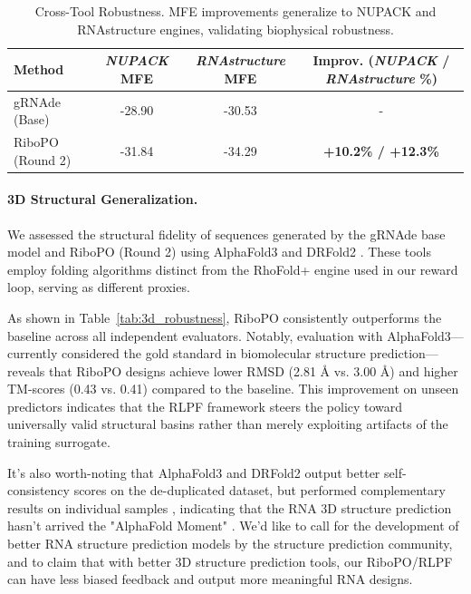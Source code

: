 {{\begin{table}[htbp]
\centering
\caption{Cross-Tool Robustness. MFE improvements generalize to NUPACK and RNAstructure engines, validating biophysical robustness.}
\label{tab:crosstool}
\begin{tabular}{lccc}
\toprule
\textbf{Method} & \textbf{\textit{NUPACK} MFE} & \textbf{\textit{RNAstructure} MFE} & \textbf{Improv. (\small{\textit{NUPACK} / \textit{RNAstructure}} \%)} \\
\midrule
gRNAde (Base)   & -28.90 & -30.53 & - \\
RiboPO (Round 2) & -31.84 & -34.29 & \textbf{+10.2\% / +12.3\%} \\
\bottomrule
\end{tabular}
\end{table}



\paragraph{3D Structural Generalization.}
We assessed the structural fidelity of sequences generated by the gRNAde base model and RiboPO (Round 2) using AlphaFold3 \citep{abramson2024accurate} and DRFold2 \citep{li2025drfold2}. These tools employ folding algorithms distinct from the RhoFold+ engine used in our reward loop, serving as different proxies. 

As shown in Table~\ref{tab:3d_robustness}, RiboPO consistently outperforms the baseline across all independent evaluators. Notably, evaluation with AlphaFold3—currently considered the gold standard in biomolecular structure prediction—reveals that RiboPO designs achieve lower RMSD (2.81 \AA{} vs. 3.00 \AA{}) and higher TM-scores (0.43 vs. 0.41) compared to the baseline. This improvement on unseen predictors indicates that the RLPF framework steers the policy toward universally valid structural basins rather than merely exploiting artifacts of the training surrogate.

It's also worth-noting that AlphaFold3 and DRFold2 output better self-consistency scores on the de-duplicated dataset, but performed complementary results on individual samples \citep{Martin2024review}, indicating that the RNA 3D structure prediction hasn't arrived the "AlphaFold Moment" \citep{li2025drfold2}. We'd like to call for the development of better RNA structure prediction models by the structure prediction community, and to claim that with better 3D structure prediction tools, our RiboPO/RLPF can have less biased feedback and output more meaningful RNA designs.

}}
